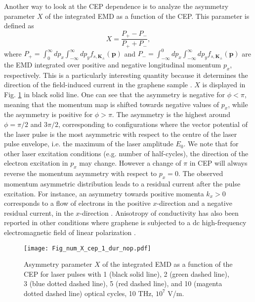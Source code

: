 \documentclass[9pt,twocolumn,twoside]{osajnl}
\begin{document}
Another way to look at the CEP dependence is to analyze the asymmetry parameter $X$ of the integrated EMD  as a function of the CEP. This parameter is defined as
\begin{equation}\label{eq_asymParam}
X= \frac{P_+-P_-}{P_++P_-},
\end{equation}
%
where $P_{+}=\int_{0}^{\infty}dp_x\int_{-\infty}^{\infty}dp_y f_{s,\mathbf{K}_{\pm}}(\textbf{p})$ and $P_{-}=\int_{-\infty}^{0}dp_x\int_{-\infty}^{\infty}dp_y f_{s,\mathbf{K}_{\pm}}(\textbf{p})$ are the EMD integrated over positive and negative longitudinal momentum $p_x$, respectively. 
%
This is a particularly interesting quantity because it determines the direction of the field-induced current in the graphene sample \cite{Higuchi:2017fk,PhysRevLett.116.197401}.
$X$ is displayed in Fig. \ref{fig_X} in black solid line.
One can see that the asymmetry is negative for  $\phi<\pi$, meaning that the momentum map is shifted towards negative values of $p_x$, while the asymmetry is positive for $\phi>\pi$. The asymmetry is the highest around $\phi=\pi/2$ and $3\pi/2$, corresponding to configurations where the vector potential of the laser pulse is the most asymmetric with respect to the centre of the laser pulse envelope, i.e. the maximum of the laser amplitude $E_0$. %
We note that for other laser excitation conditions (e.g. number of half-cycles), the direction of the electron excitation in $p_x$ may change. However a change of $\pi$ in CEP will always reverse the momentum asymmetry with respect to $p_x=0$. The observed momentum asymmetric distribution leads to a residual current after the pulse excitation. For instance, an asymmetry towards positive momenta $k_x>0$ corresponds to a flow of electrons in the positive $x$-direction and a negative residual current, in the $x$-direction \cite{Higuchi:2017fk,PhysRevLett.116.197401}. Anisotropy of conductivity has also been reported in other conditions where graphene is subjected to a dc high-frequency electromagnetic field of linear polarization \cite{Kristinsson:2016qy}.
 
\begin{figure}
\texttt{[image: Fig\_num\_X\_cep\_1\_dur\_nop.pdf]}
\caption{Asymmetry parameter $X$ of the integrated EMD as a function of the CEP for laser pulses with 1 (black solid line), 2 (green dashed line), 3 (blue dotted dashed line), 5 (red dashed line), and 10 (magenta dotted dashed line) optical cycles, 10 THz,  $10^7$ V/m.}
\label{fig_X}
\end{figure}
\end{document}

